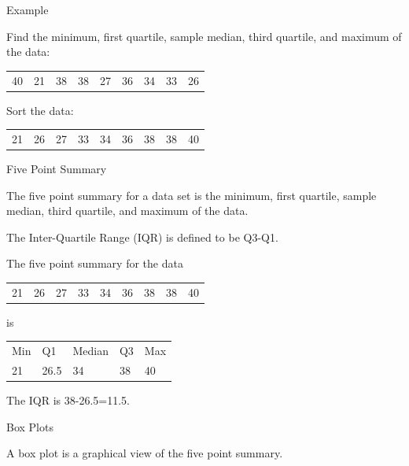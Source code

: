 \begin{frame}{Example}

  Find the minimum, first quartile, sample median, third quartile, and
  maximum of the data:\\
  \begin{tabular}{lllllllll}
    40 & 21 & 38 & 38 & 27 & 36 & 34 & 33 & 26
  \end{tabular}

  {
    \vfill
    Sort the data: \\
    \begin{tabular}{lllllllll}
      21 & 26 & 27 & 33 & 34 & 36 & 38 & 38 & 40
    \end{tabular}
  }

  \vfill
  
\end{frame}


\begin{frame}{Five Point Summary}

  \begin{definition}

    The five point summary for a data set is the minimum, first
    quartile, sample median, third quartile, and maximum of the data.
    
  \end{definition}

  \begin{definition}

    The Inter-Quartile Range (IQR) is defined to be Q3-Q1.
    
  \end{definition}


  \vfill


  {
    The five point summary for the data \
    \begin{tabular}{lllllllll}
      21 & 26 & 27 & 33 & 34 & 36 & 38 & 38 & 40
    \end{tabular}
    is \\
    \begin{tabular}{lllll}
      Min & Q1   & Median & Q3 & Max \\
      21  & 26.5 & 34     & 38 & 40
    \end{tabular}

    The IQR is 38-26.5=11.5.
  }

  
\end{frame}

\begin{frame}{Box Plots}

  \vfill

  A box plot is a graphical view of the five point summary.

  \vfill
  
\end{frame}

